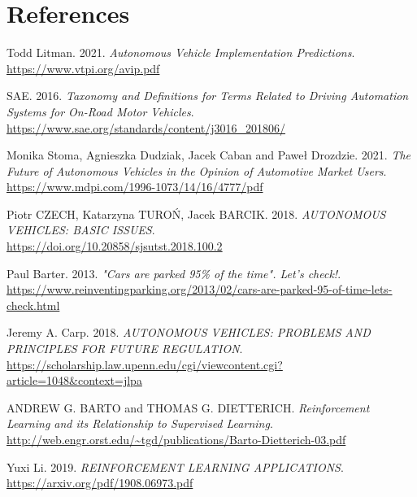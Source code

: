 \documentclass[14pt]{extarticle}
\begin{document}
\newpage
\section{References}
\begingroup
\renewcommand{\section}[2]{}
\begin{thebibliography}{999}
  Todd Litman. 2021.
  \emph{Autonomous Vehicle Implementation Predictions}.\\
  \url{https://www.vtpi.org/avip.pdf}
  
  SAE. 2016.
  \emph{Taxonomy and Definitions for Terms Related to Driving Automation Systems for On-Road Motor Vehicles}.\\
  \url{https://www.sae.org/standards/content/j3016_201806/}
   
  Monika Stoma, Agnieszka Dudziak, Jacek Caban and Paweł Drozdzie. 2021.
  \emph{The Future of Autonomous Vehicles in the Opinion of Automotive
Market Users}.\\
  \url{https://www.mdpi.com/1996-1073/14/16/4777/pdf}
   
  Piotr CZECH, Katarzyna TUROŃ, Jacek BARCIK. 2018.
  \emph{AUTONOMOUS VEHICLES: BASIC ISSUES}.\\
  \url{https://doi.org/10.20858/sjsutst.2018.100.2}
  
  Paul Barter. 2013.
  \emph{"Cars are parked 95\% of the time". Let's check!}.\\
  \url{https://www.reinventingparking.org/2013/02/cars-are-parked-95-of-time-lets-check.html}
  
  Jeremy A. Carp. 2018.
  \emph{AUTONOMOUS VEHICLES: PROBLEMS AND PRINCIPLES FOR FUTURE REGULATION}.\\
  \url{https://scholarship.law.upenn.edu/cgi/viewcontent.cgi?article=1048&context=jlpa}
 
  ANDREW G. BARTO and THOMAS G. DIETTERICH.
  \emph{Reinforcement Learning and its Relationship to Supervised Learning}.\\
  \url{http://web.engr.orst.edu/~tgd/publications/Barto-Dietterich-03.pdf}
  
  Yuxi Li. 2019.
  \emph{REINFORCEMENT LEARNING APPLICATIONS}.\\
  \url{https://arxiv.org/pdf/1908.06973.pdf}
  

\end{thebibliography}
\end{document}
